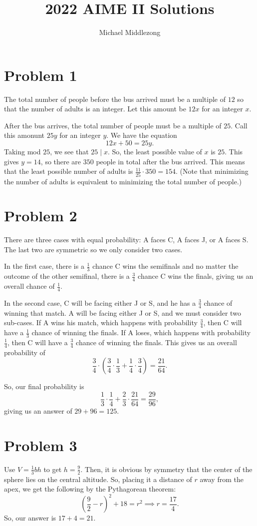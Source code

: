 \documentclass{scrartcl}
\title{2022 AIME II Solutions}
\author{Michael Middlezong}
\begin{document}
\maketitle

\section*{Problem 1}
The total number of people before the bus arrived
must be a multiple of $12$ so that the number of adults is an integer.
Let this amount be $12x$ for an integer $x$.

After the bus arrives, the total number of people must be a multiple of $25$.
Call this amonunt $25y$ for an integer $y$.
We have the equation
\[ 12x + 50 = 25y. \]
Taking mod $25$, we see that $25 \mid x$.
So, the least possible value of $x$ is $25$.
This gives $y = 14$, so there are $350$ people in total
after the bus arrived.
This means that the least possible number of adults
is $\frac{11}{25} \cdot 350 = \boxed{154}$.
(Note that minimizing the number of adults is equivalent
to minimizing the total number of people.)

\section*{Problem 2}
There are three cases with equal probability:
A faces C, A faces J, or A faces S.
The last two are symmetric so we only consider two cases.

In the first case, there is a $\frac13$ chance C wins the semifinals
and no matter the outcome of the other semifinal,
there is a $\frac34$ chance C wins the finals, giving us an overall chance of $\frac14$.

In the second case, C will be facing either J or S,
and he has a $\frac34$ chance of winning that match.
A will be facing either J or S, and we must consider two sub-cases.
If A wins his match, which happens with probability $\frac34$, then C will have a $\frac13$
chance of winning the finals.
If A loses, which happens with probability $\frac14$, then C will have a $\frac34$ chance
of winning the finals.
This gives us an overall probability of
\[ \frac34 \cdot \left(\frac34 \cdot \frac13 + \frac14 \cdot \frac34 \right) = \frac{21}{64}. \]

So, our final probability is
\[ \frac13 \cdot \frac14 + \frac23 \cdot \frac{21}{64} = \frac{29}{96}, \]
giving us an answer of $29 + 96 = \boxed{125}$.

\section*{Problem 3}
Use $V = \frac13 bh$ to get $h = \frac92$.
Then, it is obvious by symmetry that the center of the sphere lies on the central altitude.
So, placing it a distance of $r$ away from the apex,
we get the following by the Pythagorean theorem:
\[ \left( \frac92 - r \right)^2 + 18 = r^2 \implies r = \frac{17}{4}. \]
So, our answer is $17 + 4 = \boxed{21}$.
\end{document}
